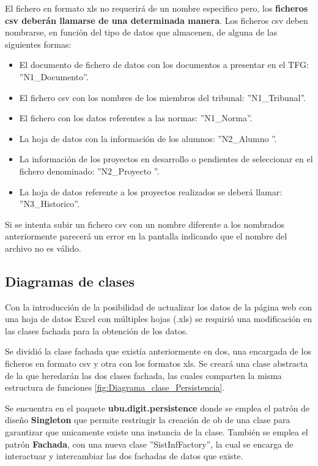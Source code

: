 El fichero en formato xls no requerirá de un nombre especifico pero, los \textbf{ficheros csv deberán llamarse de una determinada manera}. Los ficheros csv deben nombrarse, en función del tipo de datos que almacenen, de alguna de las siguientes formas:
\begin{itemize}
	\tightlist
	\item El documento de fichero de datos con los documentos a presentar en el TFG: ''N1\_Documento''.
	\item El fichero csv con los nombres de los miembros del tribunal: ''N1\_Tribunal''.
	\item El fichero con los datos referentes a las normas: ''N1\_Norma''.
	\item La hoja de datos con la información de los alumnos: ''N2\_Alumno ''.
	\item La información de los proyectos en desarrollo o pendientes de seleccionar en el fichero denominado: ''N2\_Proyecto ''.
	\item La hoja de datos referente a los proyectos realizados se deberá llamar: ''N3\_Historico''.
\end{itemize}

Si se intenta subir un fichero csv con un nombre diferente a los nombrados anteriormente parecerá un error en la pantalla indicando que el nombre del archivo no es válido.

\subsection{Diagramas de clases}	

Con la introducción de la posibilidad de actualizar los datos de la página web con una hoja de datos Excel con múltiples hojas (.xls) se requirió una modificación en las clases fachada para la obtención de los datos. 

Se dividió la clase fachada que existía anteriormente en dos, una encargada de los ficheros en formato csv y otra con los formatos xls. Se creará una clase abstracta de la que heredarán las dos clases fachada, las cuales comparten la misma estructura de funciones \ref{fig:Diagrama_clase_Persistencia}.

Se encuentra en el paquete \textbf{ubu.digit.persistence} donde se emplea el patrón de diseño \textbf{Singleton} que permite restringir la creación de ob de una clase para garantizar que unicamente existe una instancia de la clase. También se emplea el patrón \textbf{Fachada}, con una nueva clase ''SistInfFactory'', la cual se encarga de interactuar y intercambiar las dos fachadas de datos que existe.

